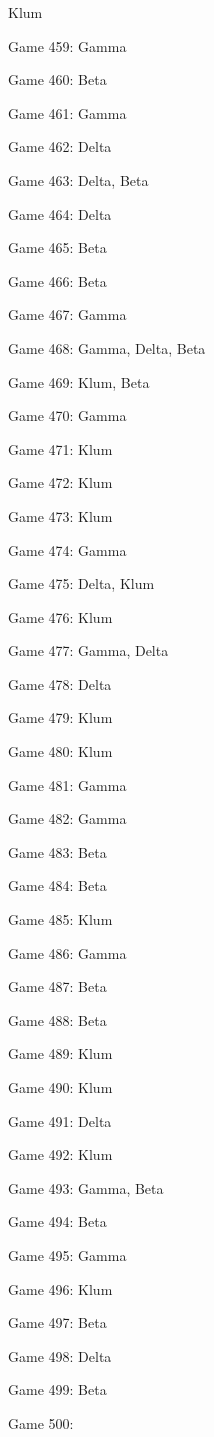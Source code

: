 \documentclass{article}
\begin{document}
\begin{multicols}{3}
\begin{compactitem}
Klum
\item Game 459:
Gamma
\item Game 460:
Beta
\item Game 461:
Gamma
\item Game 462:
Delta
\item Game 463:
Delta, Beta
\item Game 464:
Delta
\item Game 465:
Beta
\item Game 466:
Beta
\item Game 467:
Gamma
\item Game 468:
Gamma, Delta, Beta
\item Game 469:
Klum, Beta
\item Game 470:
Gamma
\item Game 471:
Klum
\item Game 472:
Klum
\item Game 473:
Klum
\item Game 474:
Gamma
\item Game 475:
Delta, Klum
\item Game 476:
Klum
\item Game 477:
Gamma, Delta
\item Game 478:
Delta
\item Game 479:
Klum
\item Game 480:
Klum
\item Game 481:
Gamma
\item Game 482:
Gamma
\item Game 483:
Beta
\item Game 484:
Beta
\item Game 485:
Klum
\item Game 486:
Gamma
\item Game 487:
Beta
\item Game 488:
Beta
\item Game 489:
Klum
\item Game 490:
Klum
\item Game 491:
Delta
\item Game 492:
Klum
\item Game 493:
Gamma, Beta
\item Game 494:
Beta
\item Game 495:
Gamma
\item Game 496:
Klum
\item Game 497:
Beta
\item Game 498:
Delta
\item Game 499:
Beta
\item Game 500:

\end{compactitem}
\end{multicols}
\end{document}
